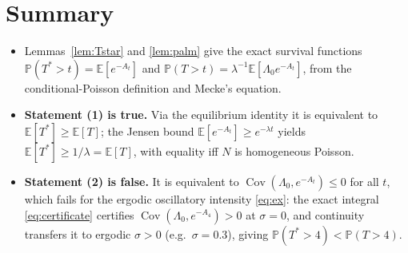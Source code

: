 \documentclass{amsart}
\theoremstyle{plain}
\theoremstyle{definition}
\newcommand{\E}{\mathbb{E}}
\newcommand{\Prob}{\mathbb{P}}
\newcommand{\Lam}{\Lambda}
\DeclareMathOperator{\Cov}{Cov}
\begin{document}
\section*{Summary}
\begin{itemize}
\item Lemmas~\ref{lem:Tstar} and \ref{lem:palm} give the exact survival functions
$\Prob(T^\ast>t)=\E[e^{-A_t}]$ and $\Prob(T>t)=\lambda^{-1}\E[\Lam_0 e^{-A_t}]$, from
the conditional-Poisson definition and Mecke's equation.
\item \textbf{Statement (1) is true.} Via the equilibrium identity it is equivalent to
$\E[T^\ast]\ge\E[T]$; the Jensen bound $\E[e^{-A_t}]\ge e^{-\lambda t}$ yields
$\E[T^\ast]\ge1/\lambda=\E[T]$, with equality iff $N$ is homogeneous Poisson.
\item \textbf{Statement (2) is false.} It is equivalent to
$\Cov(\Lam_0,e^{-A_t})\le0$ for all $t$, which fails for the ergodic oscillatory
intensity \eqref{eq:ex}: the exact integral \eqref{eq:certificate} certifies
$\Cov(\Lam_0,e^{-A_4})>0$ at $\sigma=0$, and continuity transfers it to ergodic
$\sigma>0$ (e.g.\ $\sigma=0.3$), giving $\Prob(T^\ast>4)<\Prob(T>4)$.
\end{itemize}
\end{document}
